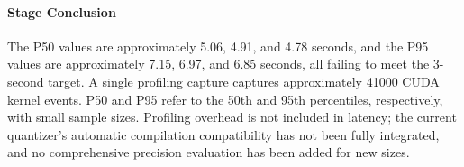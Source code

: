 \paragraph{Stage Conclusion} The P50 values are approximately 5.06, 4.91, and 4.78 seconds, and the P95 values are approximately 7.15, 6.97, and 6.85 seconds, all failing to meet the 3-second target. A single profiling capture captures approximately 41000 CUDA kernel events. P50 and P95 refer to the 50th and 95th percentiles, respectively, with small sample sizes. Profiling overhead is not included in latency; the current quantizer's automatic compilation compatibility has not been fully integrated, and no comprehensive precision evaluation has been added for new sizes.


\FloatBarrier
